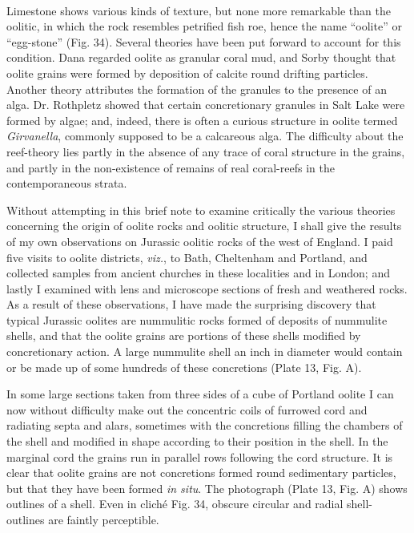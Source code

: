 \documentclass[a4paper, 12pt, oneside]{article}
\begin{document}
\paragraph{}
Limestone shows various kinds of texture, but none more remarkable than the oolitic, in which the rock resembles petrified fish roe, hence the name ``oolite'' or ``egg-stone'' (Fig. 34). Several theories have been put forward to account for this condition. Dana regarded oolite as granular coral mud, and Sorby thought that oolite grains were formed by deposition of calcite round drifting particles. Another theory attributes the formation of the granules to the presence of an alga. Dr. Rothpletz showed that certain concretionary granules in Salt Lake were formed by algae; and, indeed, there is often a curious structure in oolite termed \emph{Girvanella}, commonly supposed to be a calcareous alga. The difficulty about the reef-theory lies partly in the absence of any trace of coral structure in the grains, and partly in the non-existence of remains of real coral-reefs in the contemporaneous strata.

Without attempting in this brief note to examine critically the various theories concerning the origin of oolite rocks and oolitic structure, I shall give the results of my own observations on Jurassic oolitic rocks of the west of England. I paid five visits to oolite districts, \emph{viz.}, to Bath, Cheltenham and Portland, and collected samples from ancient churches in these localities and in London; and lastly I examined with lens and microscope sections of fresh and weathered rocks. As a result of these observations, I have made the surprising discovery that typical Jurassic oolites are nummulitic rocks formed of deposits of nummulite shells, and that the oolite grains are portions of these shells modified by concretionary action. A large nummulite shell an inch in diameter would contain or be made up of some hundreds of these concretions (Plate 13, Fig. A).

In some large sections taken from three sides of a cube of Portland oolite I can now without difficulty make out the concentric coils of furrowed cord and radiating septa and alars, sometimes with the concretions filling the chambers of the shell and modified in shape according to their position in the shell. In the marginal cord the grains run in parallel rows following the cord structure. It is clear that oolite grains are not concretions formed round sedimentary particles, but that they have been formed \emph{in situ}. The photograph (Plate 13, Fig. A) shows outlines of a shell. Even in cliché Fig. 34, obscure circular and radial shell-outlines are faintly perceptible.
\end{document}
